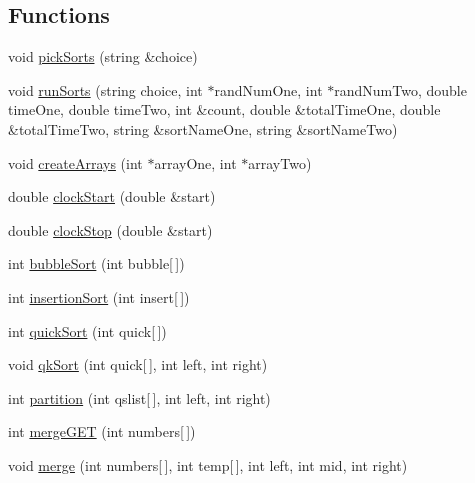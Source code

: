 \subsection*{Functions}
\begin{DoxyCompactItemize}
\item 
void \hyperlink{_mansfield_delouth-_assn4-_sort_prog_8cpp_a401a41ad70746c8dd39ecc19286b5e38}{pickSorts} (string \&choice)
\item 
void \hyperlink{_mansfield_delouth-_assn4-_sort_prog_8cpp_acd0f7b42076b153145b2198ffad4a0c2}{runSorts} (string choice, int $\ast$randNumOne, int $\ast$randNumTwo, double timeOne, double timeTwo, int \&count, double \&totalTimeOne, double \&totalTimeTwo, string \&sortNameOne, string \&sortNameTwo)
\item 
void \hyperlink{_mansfield_delouth-_assn4-_sort_prog_8cpp_af209aad9d447548ca062515ab1acbe3c}{createArrays} (int $\ast$arrayOne, int $\ast$arrayTwo)
\item 
double \hyperlink{_mansfield_delouth-_assn4-_sort_prog_8cpp_a97da3b77b5ebacff9297f22e54185c1a}{clockStart} (double \&start)
\item 
double \hyperlink{_mansfield_delouth-_assn4-_sort_prog_8cpp_aa5a4dbee524f1aa5d109bcdeeda1b9f6}{clockStop} (double \&start)
\item 
int \hyperlink{_mansfield_delouth-_assn4-_sort_prog_8cpp_a8bb793ac49cd588089713622d18a8c5b}{bubbleSort} (int bubble\mbox{[}$\,$\mbox{]})
\item 
int \hyperlink{_mansfield_delouth-_assn4-_sort_prog_8cpp_abdd451b9bf57eb321b817db4405d65fd}{insertionSort} (int insert\mbox{[}$\,$\mbox{]})
\item 
int \hyperlink{_mansfield_delouth-_assn4-_sort_prog_8cpp_a9e940b0f849a62e9ff4319606269ae38}{quickSort} (int quick\mbox{[}$\,$\mbox{]})
\item 
void \hyperlink{_mansfield_delouth-_assn4-_sort_prog_8cpp_a4b4f1e40ba9dfe94bf95212975063b17}{qkSort} (int quick\mbox{[}$\,$\mbox{]}, int left, int right)
\item 
int \hyperlink{_mansfield_delouth-_assn4-_sort_prog_8cpp_af199bb360825bf6dbcb98371c70419e1}{partition} (int qslist\mbox{[}$\,$\mbox{]}, int left, int right)
\item 
int \hyperlink{_mansfield_delouth-_assn4-_sort_prog_8cpp_a5bf887ba10188a54f08008fba4edd364}{mergeGET} (int numbers\mbox{[}$\,$\mbox{]})
\item 
void \hyperlink{_mansfield_delouth-_assn4-_sort_prog_8cpp_a22dd5c604dfcb67bc46bfd4bbb97d2f0}{merge} (int numbers\mbox{[}$\,$\mbox{]}, int temp\mbox{[}$\,$\mbox{]}, int left, int mid, int right)

\end{DoxyCompactItemize}
